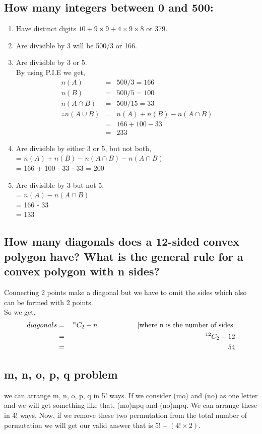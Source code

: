 \documentclass{article}
\begin{document}
\subsection{How many integers between 0 and 500:}
\begin{enumerate}
\item Have distinct digits $10 + 9\times 9 + 4\times9\times8$ or 379.
\item Are divisible by 3 will be 500/3 or 166.
\item{Are divisible by 3 or 5.\\
By using P.I.E we get,
\begin{eqnarray*}
    n(A) &=& 500/3 = 166\\
    n(B) &=& 500/5 = 100\\
    n(A\cap B) &=& 500/15 = 33\\
    \therefore n(A\cup B) &=& n(A) + n(B) - n(A\cap B)\\
    &=& 166 + 100 -33\\
    &=& 233
\end{eqnarray*}
}
\item{ Are divisible by either 3 or 5, but not both,\\ 
= $n(A) + n(B) - n(A\cap B)-n(A\cap B)$\\
= 166 + 100 - 33 - 33
= 200
}

\item{Are divisible by 3 but not 5,\\
= $n(A) - n(A\cap B)$\\
= 166 - 33\\
= 133
}

\end{enumerate}
\subsection{How many diagonals does a 12-sided convex polygon have? What is the general rule for a convex polygon with n sides?}
Connecting 2 points make  a diagonal but we have to omit the sides which also can be formed with 2 points.
\\So we get,
\begin{eqnarray*}
    diagonals &=& \,^{n} C _{2}-n \hspace{2cm}\text{[where n is the number of sides]}\\
    &=& \,^{12} C _{2} - 12\\
    &=& 54
\end{eqnarray*}
\subsection{m, n, o, p, q problem}
we can arrange m, n, o, p, q in 5! ways. If we consider (mo) and (no) as one letter and we will get something like that, (mo)npq and (no)mpq. We can arrange these in 4! ways. Now, if we remove these two permutation from the total number of permutation we will get our valid
answer that is $5! - (4!\times 2)$.
\end{document}
